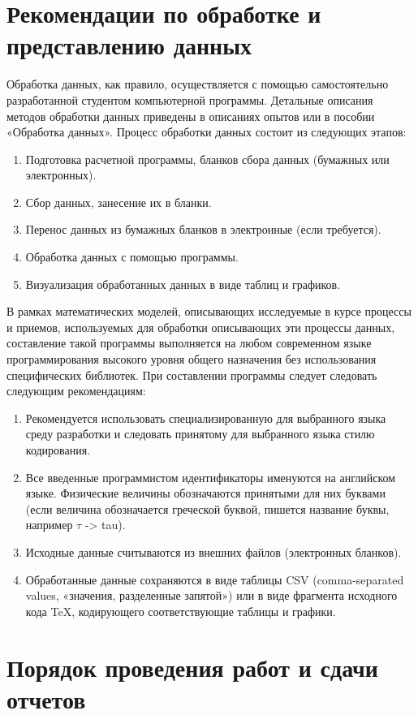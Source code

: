\section{Рекомендации по обработке и представлению данных}

Обработка данных, как правило, осуществляется с помощью самостоятельно разработанной студентом компьютерной программы. Детальные описания методов обработки данных приведены в описаниях опытов или в пособии «Обработка данных».
Процесс обработки данных состоит из следующих этапов:
\begin{enumerate}
    \item Подготовка расчетной программы, бланков сбора данных (бумажных или электронных).
    \item Сбор данных, занесение их в бланки.
    \item Перенос данных из бумажных бланков в электронные (если требуется).
    \item Обработка данных с помощью программы.
    \item Визуализация обработанных данных в виде таблиц и графиков.
\end{enumerate}

В рамках математических моделей, описывающих исследуемые в курсе процессы и приемов, используемых для обработки описывающих эти процессы данных, составление такой программы выполняется на любом современном языке программирования высокого уровня общего назначения без использования специфических библиотек. При составлении программы следует следовать следующим рекомендациям:
\begin{enumerate}
    \item Рекомендуется использовать специализированную для выбранного языка среду разработки и следовать принятому для выбранного языка стилю кодирования.
    \item Все введенные программистом идентификаторы именуются на английском языке. Физические величины обозначаются принятыми для них буквами (если величина обозначается греческой буквой, пишется название буквы, например $\tau$ -> tau).
    \item Исходные данные считываются из внешних файлов (электронных бланков).
    \item Обработанные данные сохраняются в виде таблицы CSV (comma-separated values, «значения, разделенные запятой») или в виде фрагмента исходного кода TeX, кодирующего соответствующие таблицы и графики.
\end{enumerate}

\section{Порядок проведения работ и сдачи отчетов}
